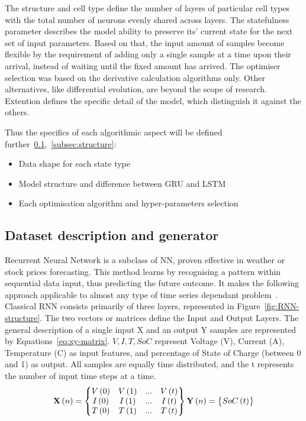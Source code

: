%
%
The structure and cell type define the number of layers of particular cell types with the total number of neurons evenly shared across layers.
The statefulness parameter describes the model ability to preserve its' current state for the next set of input parameters.
Based on that, the input amount of samples become flexible by the requirement of adding only a single sample at a time upon their arrival, instead of waiting until the fixed amount has arrived.
The optimiser selection was based on the derivative calculation algorithms only.
Other alternatives, like differential evolution, are beyond the scope of research.
Extention defines the specific detail of the model, which distinguish it against the others.

%
%
Thus the specifics of each algorithmic aspect will be defined further~\ref{subsec:dataset},~\ref{subsec:structure}:
\begin{itemize}
    \item Data shape for each state type
    \item Model structure and difference between GRU and LSTM
    \item Each optimisation algorithm and hyper-parameters selection
\end{itemize}

%
%
\subsection{Dataset description and generator} \label{subsec:dataset}
Recurrent Neural Network is a subclass of NN, proven effective in weather or stock prices forecasting.
This method learns by recognising a pattern within sequential data input, thus predicting the future outcome.
It makes the following approach applicable to almost any type of time series dependant problem~\cite{anton_battery_2013}.
Classical RNN consists primarily of three layers, represented in Figure~\ref{fig:RNN-structure}.
The two vectors or matrices define the Input and Output Layers.
The general description of a single input X and an output Y samples are represented by Equations~\ref{eq:xy-matrix}.
$V, I, T, SoC$ represent Voltage (V), Current (A), Temperature (\textdegree{}C) as input features, and percentage of State of Charge (between 0 and 1) as output.
All samples are equally time distributed, and the t represents the number of input time steps at a time.
\begin{equation}
    \textbf{X} \left (n  \right ) = 
    \begin{Bmatrix}
        V \left (0  \right ) & V \left (1  \right ) & ... & V \left (t  \right )\\ 
        I \left (0  \right ) & I \left (1  \right ) & ... & I \left (t  \right )\\ 
        T \left (0  \right ) & T \left (1  \right ) & ... & T \left (t  \right )\\
    \end{Bmatrix}
    \\ \textbf{Y} \left (n  \right ) = 
    \begin{Bmatrix}
        SoC \left (t  \right ) 
    \end{Bmatrix}
\label{eq:xy-matrix}
\end{equation}


